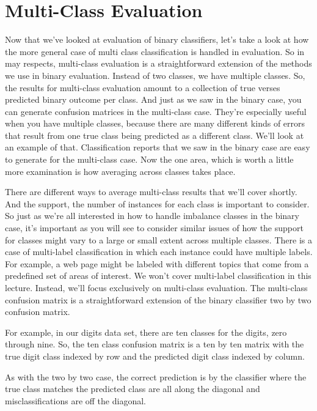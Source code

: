 \section{Multi-Class Evaluation}
\begin{multicols}{2}

Now that we've looked at evaluation of binary classifiers, let's take a look at how the more general case of multi class classification is handled in evaluation. So in may respects, multi-class evaluation is a straightforward extension of the methods we use in binary evaluation. Instead of two classes, we have multiple classes. So, the results for multi-class evaluation amount to a collection of true verses predicted binary outcome per class. And just as we saw in the binary case, you can generate confusion matrices in the multi-class case. They're especially useful when you have multiple classes, because there are many different kinds of errors that result from one true class being predicted as a different class. We'll look at an example of that. Classification reports that we saw in the binary case are easy to generate for the multi-class case. Now the one area, which is worth a little more examination is how averaging across classes takes place. 

There are different ways to average multi-class results that we'll cover shortly. And the support, the number of instances for each class is important to consider. So just as we're all interested in how to handle imbalance classes in the binary case, it's important as you will see to consider similar issues of how the support for classes might vary to a large or small extent across multiple classes. There is a case of multi-label classification in which each instance could have multiple labels. For example, a web page might be labeled with different topics that come from a predefined set of areas of interest. We won't cover multi-label classification in this lecture. Instead, we'll focus exclusively on multi-class evaluation. The multi-class confusion matrix is a straightforward extension of the binary classifier two by two confusion matrix. 

For example, in our digits data set, there are ten classes for the digits, zero through nine. So, the ten class confusion matrix is a ten by ten matrix with the true digit class indexed by row and the predicted digit class indexed by column. 

As with the two by two case, the correct prediction is by the classifier where the true class matches the predicted class are all along the diagonal and misclassifications are off the diagonal. 


\end{multicols}
